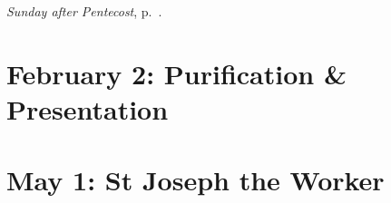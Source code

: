 {{{\begin{centering}
\emph{ Sunday after Pentecost}, p.~\pageref{pentecost2}.

\end{centering}
}
}


{
\section{February 2: Purification \& Presentation}
\subtitle{ Class}
\subtitle{I \& II Vespers}

\def\definevesperspropers{
  \def\prepsalmfive{\greseteolcustos{manual}}
}
\def\definevesperspropersalt{}
\def\vesperspropersnote{At II Vespers:}
\def\vesperspropersaltnote{At I Vespers:}
\def\premagverses{\greseteolcustos{manual}}
\def\prechapter{\label{purification-chapter}}
\def\printhymnnote{
  {
    \oldneedspace{3\baselineskip}
    \printnote{Hymn.~\emph{Ave Maris Stella}, p.~\pageref{hymn-avemarisstella}.\\}
  }
}
\bigskip
\benedicamusdomino[2]{}
}



{
\section{May 1: St Joseph the Worker}
\subtitle{ Class}
\subtitle{I \& II Vespers}

\def\definevesperspropers{
  \def\prepsalmfive{\greseteolcustos{manual}}
}
\def\definevesperspropersalt{
  \def\vrlinebreak{F}
}
\def\vesperspropersnote{At II Vespers:}
\def\vesperspropersaltnote{At I Vespers:}
\def\premagverses{\greseteolcustos{manual}}

\medskip
\printnote{\sundaycommemnoteeaster{}

}}}
